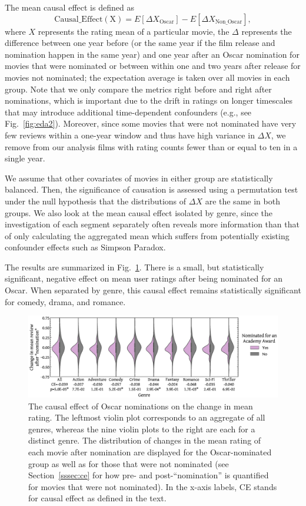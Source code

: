 \documentclass[dvipsnames]{article}
\begin{document}
The mean causal effect is defined as
%
\begin{equation}
    \mathrm{Causal\_Effect(X)} = E[\Delta X_{\mathrm{Oscar}}] - E[\Delta X_{\mathrm{Non\_Oscar}}], 
\end{equation}
%
where $X$ represents the rating mean of a particular movie, the $\Delta$ represents the difference between one year before (or the same year if the film release and nomination happen in the same year) and one year after an Oscar nomination for movies that were nominated or between within one and two years after release for movies not nominated; the expectation average is taken over all movies in each group. Note that we only compare the metrics right before and right after nominations, which is important due to the drift in ratings on longer timescales that may introduce additional time-dependent confounders (e.g., see Fig.~\ref{fig:eda2}). Moreover, since some movies that were not nominated have very few reviews within a one-year window and thus have high variance in $\Delta X$, we remove from our analysis films with rating counts fewer than or equal to ten in a single year.

We assume that other covariates of movies in either group are statistically balanced. Then, the significance of causation is assessed using a permutation test under the null hypothesis that the distributions of $\Delta X$ are the same in both groups. We also look at the mean causal effect isolated by genre, since the investigation of each segment separately often reveals more information than that of only calculating the aggregated mean which suffers from potentially existing confounder effects such as Simpson Paradox.

The results are summarized in Fig.~\ref{fig:mc}. There is a small, but statistically significant, negative effect on mean user ratings after being nominated for an Oscar. When separated by genre, this causal effect remains statistically significant for comedy, drama, and romance.

\begin{figure}
    \centering
    \includegraphics[width=\textwidth]{mc.eps}
    \caption{The causal effect of Oscar nominations on the change in mean rating. The leftmost violin plot corresponds to an aggregate of all genres, whereas the nine violin plots to the right are each for a distinct genre. The distribution of changes in the mean rating of each movie after nomination are displayed for the Oscar-nominated group as well as for those that were not nominated (see Section~\ref{sssec:ce} for how pre- and post-``nomination'' is quantified for movies that were not nominated). In the x-axis labels, CE stands for causal effect as defined in the text.}
    \label{fig:mc}
\end{figure}
\end{document}
